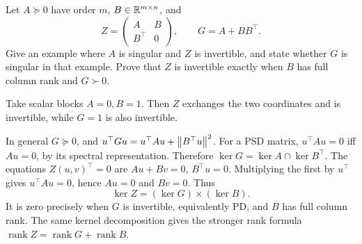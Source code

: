 \begin{problem}\label{ex:09:bordered-kernel}
Let \(A\succeq0\) have order \(m\), \(B\in\mathbb R^{m\times n}\), and
\[
 Z=\begin{pmatrix}A&B\\B^\top&0\end{pmatrix},\qquad G=A+BB^\top.
\]
Give an example where \(A\) is singular and \(Z\) is invertible, and
state whether \(G\) is singular in that example.
Prove that \(Z\) is invertible exactly when \(B\) has full column rank
and \(G\succ0\).
\end{problem}
\begin{solution}
Take scalar blocks \(A=0,B=1\). Then \(Z\) exchanges the two coordinates
and is invertible, while \(G=1\) is also invertible.

In general \(G\succeq0\), and
\(u^\top Gu=u^\top Au+\left\lVert B^\top u\right\rVert^2\).
For a PSD matrix, \(u^\top Au=0\) iff \(Au=0\), by its spectral
representation. Therefore
\(\ker G=\ker A\cap\ker B^\top\).
The equations \(Z(u,v)^\top=0\) are
\(Au+Bv=0\), \(B^\top u=0\).
Multiplying the first by \(u^\top\) gives \(u^\top Au=0\), hence
\(Au=0\) and \(Bv=0\).
Thus
\[
 \ker Z=(\ker G)\times(\ker B).
\]
It is zero precisely when \(G\) is invertible, equivalently PD,
and \(B\) has full column rank.
The same kernel decomposition gives the stronger rank formula
\(\operatorname{rank}Z=\operatorname{rank}G+\operatorname{rank}B\).
\end{solution}

